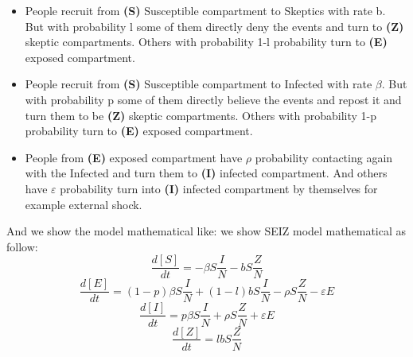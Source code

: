  \begin{itemize}
\item People recruit from \textbf{(S)} Susceptible compartment to Skeptics with rate b. But with probability l some of them directly deny the events and turn to \textbf{(Z)} skeptic compartments. Others  with probability 1-l probability turn to \textbf{(E)} exposed compartment.
\item People recruit from \textbf{(S)} Susceptible compartment to Infected with rate $\beta$. But with probability p some of them directly believe the events and repost it and turn them to be \textbf{(Z)} skeptic compartments. Others  with probability 1-p probability turn to \textbf{(E)} exposed compartment.
\item  People from \textbf{(E)} exposed compartment have $\rho$ probability contacting again with the Infected and turn them to \textbf{(I)} infected compartment. And others have $\varepsilon$ probability turn into \textbf{(I)} infected compartment by themselves for example external shock.
\end{itemize}



And we show the model mathematical like:
we show SEIZ model mathematical as follow:
\begin{equation}
\frac{d[S]}{dt}=- \beta S\frac{I}{N}- b S\frac{Z}{N}
\end{equation}
\begin{equation}
\frac{d[E]}{dt}=(1-p)\beta S\frac{I}{N}+(1-l) b S\frac{I}{N}-\rho  S\frac{Z}{N}-\varepsilon E
\end{equation}
\begin{equation}
\frac{d[I]}{dt}=p\beta S\frac{I}{N}+\rho  S\frac{Z}{N}+\varepsilon E
\end{equation}
\begin{equation}
\frac{d[Z]}{dt}=lbS\frac{Z}{N} 
\end{equation}

